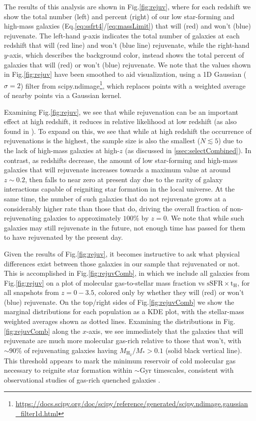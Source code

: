 \documentclass[twocolumn, linenumbers]{aastex631}
\newcommand{\mhh}{M_{\text{H}_2}}
\newcommand{\ssfr}{\text{sSFR}}
\newcommand{\tH}{\text{t}_\text{H}}
\newcommand{\eq}{Eq.\hspace{.2em}}
\renewcommand{\fig}{Fig.\hspace{.2em}}
\begin{document}
The results of this analysis are shown in \fig \ref{fig:rejuv}, where for each redshift we show the total number (left) and percent (right) of our low star-forming and high-mass galaxies (\eq \ref{eq:ssfrt4}/\ref{eq:massLimit}) that will (red) and won't (blue) rejuvenate.  The left-hand $y$-axis indicates the total number of galaxies at each redshift that will (red line) and won't (blue line) rejuvenate, while the right-hand $y$-axis, which describes the background color, instead shows the total percent of galaxies that will (red) or won't (blue) rejuvenate.  We note that the values shown in \fig \ref{fig:rejuv} have been smoothed to aid visualization, using a 1D Gaussian ($\sigma=2$) filter from {\sc scipy.ndimage}\footnote{\url{https://docs.scipy.org/doc/scipy/reference/generated/scipy.ndimage.gaussian_filter1d.html}}, which replaces points with a weighted average of nearby points via a Gaussian kernel.

Examining \fig \ref{fig:rejuv}, we see that while rejuvenation can be an important effect at high redshift, it reduces in relative likelihood at low redshift (as also found in \citealt{Szpila25}).  To expand on this, we see that while at high redshift the occurrence of rejuvenations is the highest, the sample size is also the smallest ($N\lesssim 5$) due to the lack of high-mass galaxies at high-$z$ (as discussed in \ref{ssec:selectCombined}).  In contrast, as redshifts decrease, the amount of low star-forming and high-mass galaxies that will rejuvenate increases towards a maximum value at around $z\sim 0.2$, then falls to near zero at present day due to the rarity of galaxy interactions capable of reigniting star formation in the local universe.  At the same time, the number of such galaxies that do not rejuvenate grows at a considerably higher rate than those that do, driving the overall fraction of non-rejuvenating galaxies to approximately $100\%$ by $z=0$.  We note that while such galaxies may still rejuvenate in the future, not enough time has passed for them to have rejuvenated by the present day. 


Given the results of \fig \ref{fig:rejuv}, it becomes instructive to ask what physical differences exist between those galaxies in our sample that rejuvenated or not.  This is accomplished in \fig \ref{fig:rejuvComb}, in which we include all galaxies from \fig \ref{fig:rejuv} on a plot of molecular gas-to-stellar mass fraction vs $\ssfr\times\tH$, for all snapshots from $z=0-3.5$, colored only by whether they will (red) or won't (blue) rejuvenate.  On the top/right sides of \fig \ref{fig:rejuvComb} we show the marginal distributions for each population as a KDE plot, with the stellar-mass weighted averages shown as dotted lines.  Examining the distributions in \fig \ref{fig:rejuvComb} along the $x$-axis, we see immediately that the galaxies that will rejuvenate are much more molecular gas-rich relative to those that won't, with $\sim90\%$ of rejuvenating galaxies having $\mhh/M_*>0.1$ (solid black vertical line).  This threshold appears to mark the minimum reservoir of cold molecular gas necessary to reignite star formation within $\sim$Gyr timescales, consistent with observational studies of gas-rich quenched galaxies \citep[e.g.][]{french_2015, rowlands}.
\end{document}
